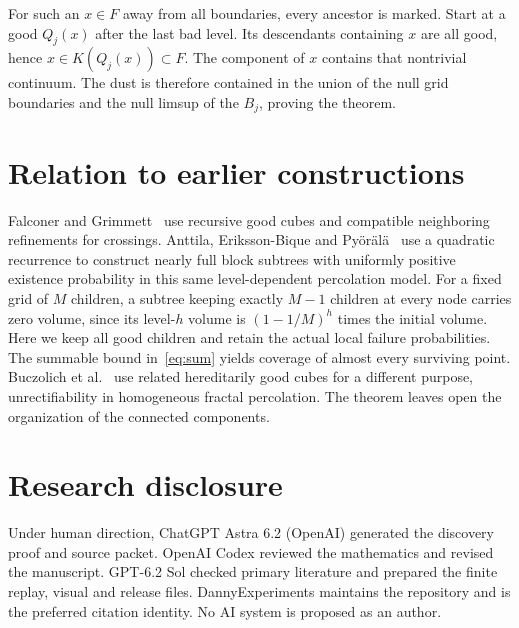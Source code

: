 \documentclass[11pt]{amsart}
\begin{document}
For such an $x\in F$ away from all boundaries, every ancestor is marked. Start at a good $Q_j(x)$ after the last bad level. Its descendants containing $x$ are all good, hence $x\in K(Q_j(x))\subset F$. The component of $x$ contains that nontrivial continuum. The dust is therefore contained in the union of the null grid boundaries and the null limsup of the $B_j$, proving the theorem.

\newpage
\section{Relation to earlier constructions}
Falconer and Grimmett~\cite[pp.~482--484]{FG} use recursive good cubes and compatible neighboring refinements for crossings. Anttila, Eriksson-Bique and Py\"or\"al\"a~\cite[\S3.1 and Theorems~4.1, 5.1]{A} use a quadratic recurrence to construct nearly full block subtrees with uniformly positive existence probability in this same level-dependent percolation model. For a fixed grid of $M$ children, a subtree keeping exactly $M-1$ children at every node carries zero volume, since its level-$h$ volume is $(1-1/M)^h$ times the initial volume. Here we keep all good children and retain the actual local failure probabilities. The summable bound in~\eqref{eq:sum} yields coverage of almost every surviving point. Buczolich et al.~\cite[\S5]{U} use related hereditarily good cubes for a different purpose, unrectifiability in homogeneous fractal percolation. The theorem leaves open the organization of the connected components.

\section*{Research disclosure}
Under human direction, ChatGPT Astra 6.2 (OpenAI) generated the discovery proof and source packet. OpenAI Codex reviewed the mathematics and revised the manuscript. GPT-6.2 Sol checked primary literature and prepared the finite replay, visual and release files. DannyExperiments maintains the repository and is the preferred citation identity. No AI system is proposed as an author.
\end{document}
